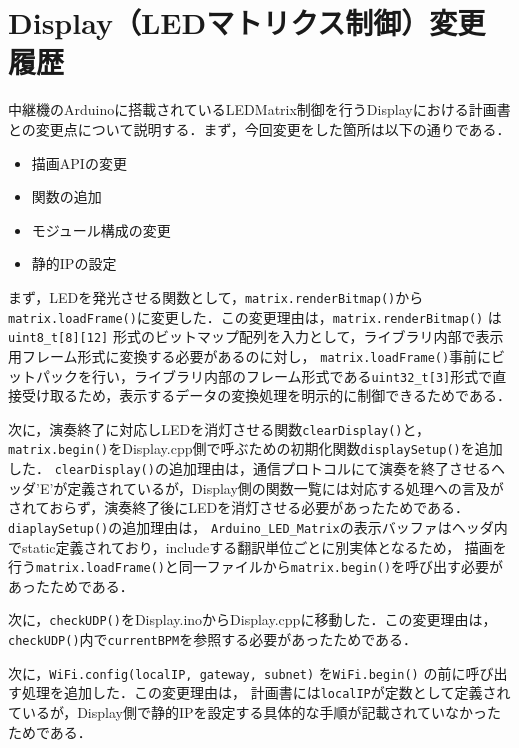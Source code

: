 \documentclass[uplatex,dvipdfmx,a4paper,11pt]{jsarticle}
\begin{document}
\section{Display（LEDマトリクス制御）変更履歴}

中継機のArduinoに搭載されているLEDMatrix制御を行うDisplayにおける計画書との変更点について説明する．まず，今回変更をした箇所は以下の通りである．

\begin{itemize}
\item 描画APIの変更
\item 関数の追加
\item モジュール構成の変更
\item 静的IPの設定
\end{itemize}

まず，LEDを発光させる関数として，\texttt{matrix.renderBitmap()}から\texttt{matrix.loadFrame()}に変更した．この変更理由は，\texttt{matrix.renderBitmap()} は\texttt{uint8\_t[8][12]} 形式のビットマップ配列を入力として，ライブラリ内部で表示用フレーム形式に変換する必要があるのに対し，
\texttt{matrix.loadFrame()}事前にビットパックを行い，ライブラリ内部のフレーム形式である\texttt{uint32\_t[3]}形式で直接受け取るため，表示するデータの変換処理を明示的に制御できるためである．\par

次に，演奏終了に対応しLEDを消灯させる関数\texttt{clearDisplay()}と，\texttt{matrix.begin()}をDisplay.cpp側で呼ぶための初期化関数\texttt{displaySetup()}を追加した．
\texttt{clearDisplay()}の追加理由は，通信プロトコルにて演奏を終了させるヘッダ'E'が定義されているが，Display側の関数一覧には対応する処理への言及がされておらず，演奏終了後にLEDを消灯させる必要があったためである．
\texttt{diaplaySetup()}の追加理由は， \texttt{Arduino\_LED\_Matrix}の表示バッファはヘッダ内でstatic定義されており，includeする翻訳単位ごとに別実体となるため，
描画を行う\texttt{matrix.loadFrame()}と同一ファイルから\texttt{matrix.begin()}を呼び出す必要があったためである．\par
次に，\texttt{checkUDP()}をDisplay.inoからDisplay.cppに移動した．この変更理由は，\texttt{checkUDP()}内で\texttt{currentBPM}を参照する必要があったためである．\par
次に，\texttt{WiFi.config(localIP, gateway, subnet)} を\texttt{WiFi.begin()} の前に呼び出す処理を追加した．この変更理由は，
計画書には\texttt{localIP}が定数として定義されているが，Display側で静的IPを設定する具体的な手順が記載されていなかったためである．





 
\end{document}
